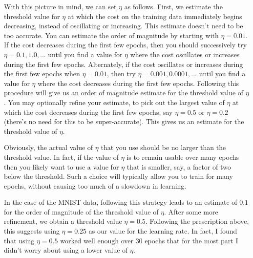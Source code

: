 With this picture in mind, we can set $\eta$ as follows. First, we estimate the threshold value for $\eta$ at which the cost on the training data immediately begins decreasing, instead of oscillating or increasing. This estimate doesn't need to be too accurate. You can estimate the order of magnitude by starting with $\eta = 0.01$. If the cost decreases during the first few epochs, then you should successively try $\eta = 0.1, 1.0, \ldots$ until you find a value for $\eta$ where the cost oscillates or increases during the first few epochs. Alternately, if the cost oscillates or increases during the first few epochs when $\eta = 0.01$, then try $\eta = 0.001, 0.0001, \ldots$ until you find a value for $\eta$ where the cost decreases during the first few epochs. Following this procedure will give us an order of magnitude estimate for the threshold value of $\eta$. You may optionally refine your estimate, to pick out the largest value of $\eta$ at which the cost decreases during the first few epochs, say $\eta = 0.5$ or $\eta = 0.2$ (there's no need for this to be super-accurate). This gives us an estimate for the threshold value of $\eta$.


Obviously, the actual value of $\eta$ that you use should be no larger than the threshold value. In fact, if the value of $\eta$ is to remain usable over many epochs then you likely want to use a value for $\eta$ that is smaller, say, a factor of two below the threshold. Such a choice will typically allow you to train for many epochs, without causing too much of a slowdown in learning.


In the case of the MNIST data, following this strategy leads to an estimate of $0.1$ for the order of magnitude of the threshold value of $\eta$. After some more refinement, we obtain a threshold value $\eta = 0.5$. Following the prescription above, this suggests using $\eta = 0.25$ as our value for the learning rate. In fact, I found that using $\eta = 0.5$ worked well enough over $30$ epochs that for the most part I didn't worry about using a lower value of $\eta$.


